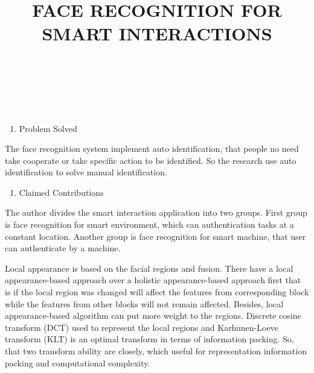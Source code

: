 \documentclass[a4paper,12pt]{article}
\begin{document}
\title{FACE RECOGNITION FOR SMART INTERACTIONS}
\author{~\cite{4284823}}
\date{}


\maketitle
{}\\

\begin{enumerate}[{1.}]\bfseries

\item{\normalsize  Problem Solved}

\end{enumerate}

The face recognition system implement auto identification, that people no need take cooperate or take specific action to be identified. So the research use auto identification to solve manual identification.\\

\begin{enumerate}[{2.}]\bfseries
\item{\normalsize Claimed Contributions}
\end{enumerate}
The author divides the smart interaction application into two groups. First group is face recognition for smart environment, which can authentication tasks at a constant location. Another group is face recognition for smart machine, that user can authenticate by a machine. 

Local appearance is based on the facial regions and fusion. There have a local appearance-based approach over a holistic appearance-based approach first that is if the local region was changed will affect the features from corresponding block while the features from other blocks will not remain affected. Besides, local appearance-based algorithm can put more weight to the regions.
Discrete cosine transform (DCT) used to represent the local regions and Karhunen-Loeve transform (KLT) is an optimal transform in terms of information packing. So, that two transform ability are closely, which useful for representation information packing and computational complexity. 
\end{document}
